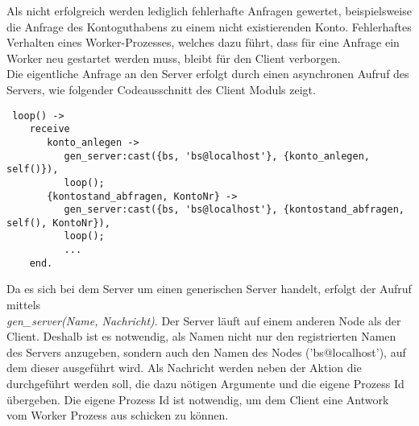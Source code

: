 Als nicht erfolgreich werden lediglich fehlerhafte Anfragen gewertet, beispielsweise die Anfrage des Kontoguthabens zu einem nicht existierenden Konto. Fehlerhaftes Verhalten eines Worker-Prozesses, welches dazu führt, dass für eine Anfrage ein Worker neu gestartet werden muss, bleibt für den Client verborgen.\\
Die eigentliche Anfrage an den Server erfolgt durch einen asynchronen Aufruf des Servers, wie folgender Codeausschnitt des Client Moduls zeigt.
\begin{lstlisting} 
 loop() ->
    receive
       konto_anlegen ->
          gen_server:cast({bs, 'bs@localhost'}, {konto_anlegen, self()}),
          loop();
       {kontostand_abfragen, KontoNr} ->
          gen_server:cast({bs, 'bs@localhost'}, {kontostand_abfragen, self(), KontoNr}),
          loop();
	   	  ...
    end.
\end{lstlisting}
Da es sich bei dem Server um einen generischen Server handelt, erfolgt der Aufruf mittels \\ \textit{gen\_server(Name, Nachricht)}. Der Server läuft auf einem anderen Node als der Client. Deshalb ist es notwendig, als Namen nicht nur den registrierten Namen des Servers anzugeben, sondern auch den Namen des Nodes ('bs@localhost'), auf dem dieser ausgeführt wird. Als Nachricht werden neben der Aktion die durchgeführt werden soll, die dazu nötigen Argumente und die eigene Prozess Id übergeben. Die eigene Prozess Id ist notwendig, um dem Client eine Antwork vom Worker Prozess aus schicken zu können.